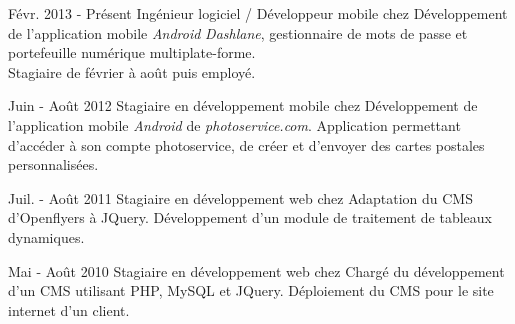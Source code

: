 \cventry
{Févr. 2013 - Présent}
{Ingénieur logiciel / Développeur mobile}
{chez }
{}
{}
{
	Développement de l'application mobile \textit{Android} \textit{Dashlane},
	gestionnaire de mots de passe et portefeuille numérique multiplate-forme.\\
	Stagiaire de février à août puis employé.
}

%
\vspace{5pt}
\cventry
{Juin - Août 2012}
{Stagiaire en développement mobile}
{chez }
{}
{}
{
	Développement de l'application mobile \textit{Android} de \textit{photoservice.com}. 
	Application permettant d'accéder à son compte photoservice, de créer et d'envoyer des cartes postales personnalisées.
}

\vspace{5pt}
\cventry
{Juil. - Août 2011}
{Stagiaire en développement web}
{chez }
{}
{}
{
	Adaptation du CMS d'Openflyers à JQuery. 
	Développement d'un module de traitement de tableaux dynamiques.
}

\vspace{5pt}
\cventry
{Mai - Août 2010}
{Stagiaire en développement web}
{chez }
{}
{}
{
	Chargé du développement d'un CMS utilisant PHP, MySQL et JQuery. 
	Déploiement du CMS pour le site internet d'un client.
}